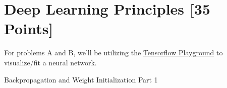 


\newpage
\section{Deep Learning Principles [35 Points]}

    For problems A and B, we'll be utilizing the \href{http://playground.tensorflow.org/}{Tensorflow Playground} to visualize/fit a neural network.

\begin{problem}[5]
    Backpropagation and Weight Initialization Part 1
\end{problem}

